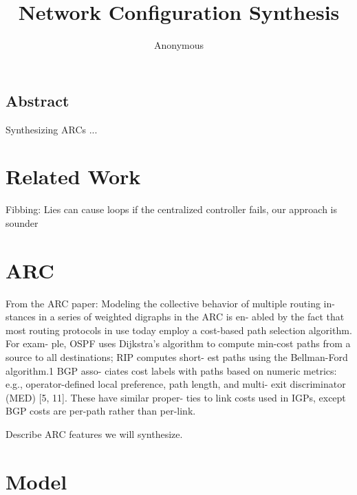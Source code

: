 \documentclass{hotnets16}
\begin{document}
 {}
\date{}


\title{Network Configuration Synthesis}

\author{Anonymous}

\maketitle


\subsection*{Abstract}

Synthesizing ARCs ...




\section{Related Work}

Fibbing: Lies can cause loops if the centralized controller fails,
our approach is sounder

\section{ARC}
From the ARC paper:
Modeling the collective behavior of multiple routing in- stances in a series of weighted digraphs in the ARC is en- abled by the fact that most routing protocols in use today employ a cost-based path selection algorithm. For exam- ple, OSPF uses Dijkstra’s algorithm to compute min-cost paths from a source to all destinations; RIP computes short- est paths using the Bellman-Ford algorithm.1 BGP asso- ciates cost labels with paths based on numeric metrics: e.g., operator-defined local preference, path length, and multi- exit discriminator (MED) [5, 11]. These have similar proper- ties to link costs used in IGPs, except BGP costs are per-path rather than per-link.


Describe ARC features we will synthesize.

\section{Model}
\end{document}
